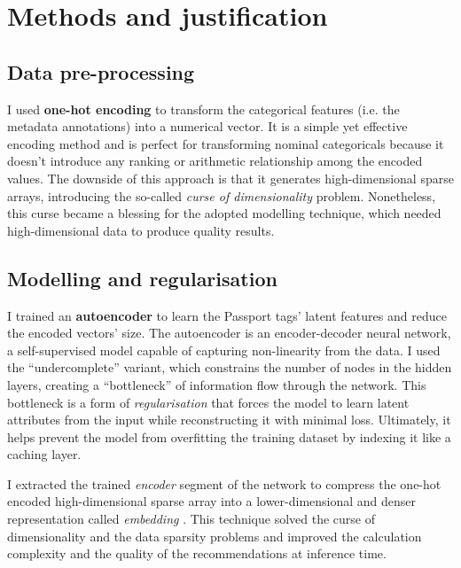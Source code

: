 
\section{Methods and justification}

\subsection{Data pre-processing}

I used \textbf{one-hot encoding} to transform the categorical features (i.e. the metadata annotations) into a numerical vector.
It is a simple yet effective encoding method and is perfect for transforming nominal categoricals because it doesn’t introduce
any ranking or arithmetic relationship among the encoded values.
The downside of this approach is that it generates high-dimensional sparse arrays,
introducing the so-called \textit{curse of dimensionality} problem.
Nonetheless, this curse became a blessing for the adopted modelling technique,
which needed high-dimensional data to produce quality results.

\subsection{Modelling and regularisation}

I trained an \textbf{autoencoder} \cite{DBLP:journals/corr/abs-2003-05991,DBLP:journals/corr/abs-2201-03898}
to learn the Passport tags' latent features and reduce the encoded vectors' size.
The autoencoder is an encoder-decoder neural network, a self-supervised model capable of capturing non-linearity from the data.
I used the ``undercomplete'' variant, which constrains the number of nodes in the hidden layers, creating a ``bottleneck''
of information flow through the network.
This bottleneck is a form of \textit{regularisation} that forces the model to learn latent attributes from the input
while reconstructing it with minimal loss. Ultimately, it helps prevent the model from overfitting the training dataset by indexing it like a caching layer.

I extracted the trained \textit{encoder} segment of the network to compress the one-hot encoded high-dimensional sparse array into
a lower-dimensional and denser representation called \textit{embedding} \cite{GoogleForDevelopers:Embeddings}.
This technique solved the curse of dimensionality and the data sparsity problems and improved the calculation
complexity and the quality of the recommendations at inference time.


